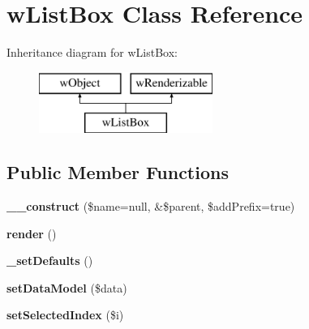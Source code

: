 \hypertarget{classwListBox}{
\section{wListBox Class Reference}
\label{classwListBox}
}
Inheritance diagram for wListBox:\begin{figure}[H]
\begin{center}
\leavevmode
\includegraphics[height=2.000000cm]{classwListBox}
\end{center}
\end{figure}
\subsection*{Public Member Functions}
\begin{DoxyCompactItemize}
\item 
\hypertarget{classwListBox_a83b4f49e769483f784eb0e49da8f8135}{
{\bfseries \_\-\_\-construct} (\$name=null, \&\$parent, \$addPrefix=true)}
\label{classwListBox_a83b4f49e769483f784eb0e49da8f8135}

\item 
\hypertarget{classwListBox_af57c322706fb96114554dca85364e42f}{
{\bfseries render} ()}
\label{classwListBox_af57c322706fb96114554dca85364e42f}

\item 
\hypertarget{classwListBox_a5e64d56c76c0c82b3c974963f794d172}{
{\bfseries \_\-setDefaults} ()}
\label{classwListBox_a5e64d56c76c0c82b3c974963f794d172}

\item 
\hypertarget{classwListBox_a77fed9be31a93e528b9d9938abe266e8}{
{\bfseries setDataModel} (\$data)}
\label{classwListBox_a77fed9be31a93e528b9d9938abe266e8}

\item 
\hypertarget{classwListBox_a2413f57ed79bea737d3721abe54a3ffb}{
{\bfseries setSelectedIndex} (\$i)}
\label{classwListBox_a2413f57ed79bea737d3721abe54a3ffb}

\end{DoxyCompactItemize}
